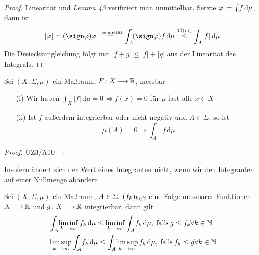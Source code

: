 \documentclass[skript.tex]{subfiles}
\begin{document}
			\begin{proof}
				Linearität und \textit{Lemma 43} verifiziert man unmittelbar. Setzte $\varphi\coloneqq\int \! f \, \mathrm{d}\mu$, dann ist
				\begin{equation*}
					|\varphi|= (\sign \varphi)\varphi \stackrel{\text{Linearität}}= \int_A \! (\sign \varphi)f \, \mathrm{d}\mu \stackrel{43(vi)}{\leq} \int_A \! |f| \, \mathrm{d}\mu
				\end{equation*}
				Die Dreiecksungleichung folgt mit $|f+g|\leq|f|+|g|$ aus der Linearität des Integrals.
			\end{proof}

			\begin{lem}
				Sei $(X,\Sigma,\mu)$ ein Maßraum, $F\colon X\kern -1pt \longrightarrow \kern -1pt\mathbb{R}$, messbar
				\begin{itemize}
					\item[(i)] Wir haben $\int_X \! |f| \, \mathrm{d}\mu=0 \Leftrightarrow f(x)=0$ für $\mu$-fast alle $x\in X$
					\item[(ii)] Ist $f$ außerdem integrierbar oder nicht negativ und $A\in\Sigma$, so ist
						\begin{equation*}
							\mu(A)=0 \Rightarrow \int_A \! f \, \mathrm{d}\mu
						\end{equation*}
				\end{itemize}
			\end{lem}

			\begin{proof}
				ÜZ3/A10
			\end{proof}

			Insofern ändert sich der Wert eines Integranten nicht, wenn wir den Integranten auf einer Nullmenge abändern.

			\begin{lem}
				Sei $(X,\Sigma,\mu)$ ein Maßraum, $A\in\Sigma, \: (f_k)_{k\in\mathbb{N}}$ eine Folge messbarer Funktionen $X\kern -1pt \longrightarrow \kern -1pt\mathbb{R}$ und $g\colon X\kern -1pt \longrightarrow \kern -1pt\mathbb{R}$ integrierbar, dann gilt
				\begin{align*}
				&\int_A \! \liminf\limits_{k\kern -1pt \longrightarrow \kern -1pt\infty} f_k \, \mathrm{d}\mu \leq \liminf\limits_{k\kern -1pt \longrightarrow \kern -1pt\infty}\int_A \! f_k \, \mathrm{d}\mu, \: \mathrm{falls} \: g\leq f_k  \forall k\in\mathbb{N} \\
				&\limsup\limits_{k\kern -1pt \longrightarrow \kern -1pt\infty}\int_A \! f_k \, \mathrm{d}\mu \leq \int_A \! \limsup\limits_{k\kern -1pt \longrightarrow \kern -1pt\infty} f_k \, \mathrm{d}\mu, \: \mathrm{falls} \: f_k\leq g \forall k\in\mathbb{N}
				\end{align*}
			\end{lem}
\end{document}
